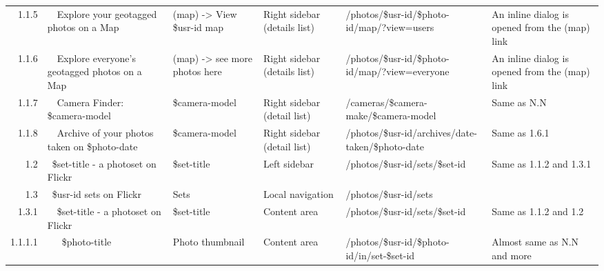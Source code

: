 \documentclass[12pt,a4paper]{article}
\begin{document}
\begin{landscape}
\begin{table}[h!b!p!]
\begin{center}
\begin{tiny}
\begin{tabular}{r|l|l|l|l|p{3cm}}
                1.1.5 &
                ~~Explore your geotagged photos on a Map &
                (map) -> View \$usr-id map &
                Right sidebar (details list) &
                /photos/\$usr-id/\$photo-id/map/?view=users &
                An inline dialog is opened from the (map) link \\

                1.1.6 &
                ~~Explore everyone's geotagged photos on a Map &
                (map) -> see more photos here &
                Right sidebar (details list) &
                /photos/\$usr-id/\$photo-id/map/?view=everyone &
                An inline dialog is opened from the (map) link \\

                1.1.7 &
                ~~Camera Finder: \$camera-model &
                \$camera-model &
                Right sidebar (detail list) &
                /cameras/\$camera-make/\$camera-model &
                Same as N.N \\

                1.1.8 &
                ~~Archive of your photos taken on \$photo-date &
                \$camera-model &
                Right sidebar (detail list) &
                /photos/\$usr-id/archives/date-taken/\$photo-date &
                Same as 1.6.1 \\

              1.2 &
              ~\$set-title - a photoset on Flickr &
              \$set-title &
              Left sidebar &
              /photos/\$usr-id/sets/\$set-id &
              Same as 1.1.2 and 1.3.1 \\

              1.3 &
              ~\$usr-id sets on Flickr &
              Sets &
              Local navigation &
              /photos/\$usr-id/sets &
              \\

                1.3.1 &
                ~~\$set-title - a photoset on Flickr &
                \$set-title &
                Content area &
                /photos/\$usr-id/sets/\$set-id &
                Same as 1.1.2 and 1.2 \\

                  1.1.1.1 &
                  ~~~\$photo-title &
                  Photo thumbnail &
                  Content area &
                  /photos/\$usr-id/\$photo-id/in/set-\$set-id &
                  Almost same as N.N and more\\



\end{tabular}
\end{tiny}
\end{center}
\end{table}
\end{landscape}
\end{document}
